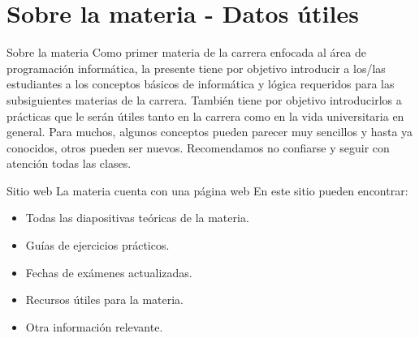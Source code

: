 \titleframe


\section{Sobre la materia - Datos útiles}


\begin{frame}{Sobre la materia}
  Como primer materia de la carrera enfocada al área de programación 
  informática, la presente tiene por objetivo introducir a los/las estudiantes
  a los conceptos básicos de informática y lógica requeridos para las
  subsiguientes materias de la carrera.
  \jump
  También tiene por objetivo introducirlos a prácticas que le serán útiles
  tanto en la carrera como en la vida universitaria en general.
  \jump
  Para muchos, algunos conceptos pueden parecer muy sencillos y hasta ya
  conocidos, otros pueden ser nuevos. Recomendamos no confiarse y seguir
  con atención todas las clases.
\end{frame}


\begin{frame}{Sitio web}
  La materia cuenta con una página web
  \jump
  \jump
  En este sitio pueden encontrar:
  \begin{itemize}
    \item Todas las diapositivas teóricas de la materia.
    \item Guías de ejercicios prácticos.
    \item Fechas de exámenes actualizadas.
    \item Recursos útiles para la materia.
    \item Otra información relevante.
  \end{itemize}
  \emptyline
\end{frame}


